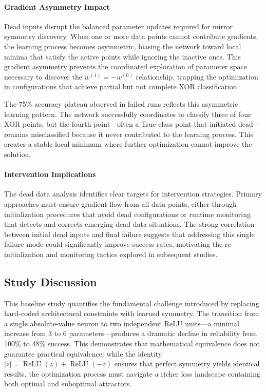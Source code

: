 \paragraph{Gradient Asymmetry Impact}
Dead inputs disrupt the balanced parameter updates required for mirror symmetry discovery. When one or more data points cannot contribute gradients, the learning process becomes asymmetric, biasing the network toward local minima that satisfy the active points while ignoring the inactive ones. This gradient asymmetry prevents the coordinated exploration of parameter space necessary to discover the $w^{(1)} = -w^{(0)}$ relationship, trapping the optimization in configurations that achieve partial but not complete XOR classification.

The 75\% accuracy plateau observed in failed runs reflects this asymmetric learning pattern. The network successfully coordinates to classify three of four XOR points, but the fourth point—often a True class point that initiated dead—remains misclassified because it never contributed to the learning process. This creates a stable local minimum where further optimization cannot improve the solution.

\paragraph{Intervention Implications}
The dead data analysis identifies clear targets for intervention strategies. Primary approaches must ensure gradient flow from all data points, either through initialization procedures that avoid dead configurations or runtime monitoring that detects and corrects emerging dead data situations. The strong correlation between initial dead inputs and final failure suggests that addressing this single failure mode could significantly improve success rates, motivating the re-initialization and monitoring tactics explored in subsequent studies.


\subsection*{Study Discussion}

This baseline study quantifies the fundamental challenge introduced by replacing hard-coded architectural constraints with learned symmetry. The transition from a single absolute-value neuron to two independent ReLU units—a minimal increase from 3 to 6 parameters—produces a dramatic decline in reliability from 100\% to 48\% success. This demonstrates that mathematical equivalence does not guarantee practical equivalence: while the identity $|z| = \operatorname{ReLU}(z) + \operatorname{ReLU}(-z)$ ensures that perfect symmetry yields identical results, the optimization process must navigate a richer loss landscape containing both optimal and suboptimal attractors.

